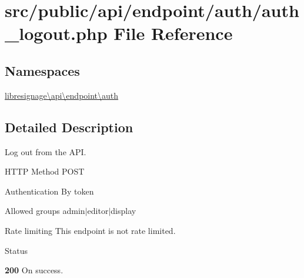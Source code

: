 \hypertarget{src_2public_2api_2endpoint_2auth_2auth__logout_8php}{}\section{src/public/api/endpoint/auth/auth\+\_\+logout.php File Reference}
\label{src_2public_2api_2endpoint_2auth_2auth__logout_8php}
\subsection*{Namespaces}
\begin{DoxyCompactItemize}
\item 
 \hyperlink{namespacelibresignage_1_1api_1_1endpoint_1_1auth}{libresignage\textbackslash{}api\textbackslash{}endpoint\textbackslash{}auth}
\end{DoxyCompactItemize}


\subsection{Detailed Description}
Log out from the A\+PI.

\begin{DoxyParagraph}{H\+T\+TP Method}
P\+O\+ST 
\end{DoxyParagraph}
\begin{DoxyParagraph}{Authentication}
By token 
\end{DoxyParagraph}
\begin{DoxyParagraph}{Allowed groups}
{\ttfamily admin$\vert$editor$\vert$display} 
\end{DoxyParagraph}
\begin{DoxyParagraph}{Rate limiting}
This endpoint is not rate limited.
\end{DoxyParagraph}
\begin{DoxyParagraph}{Status}

\begin{DoxyItemize}
\item {\bfseries 200} On success. 
\end{DoxyItemize}
\end{DoxyParagraph}
